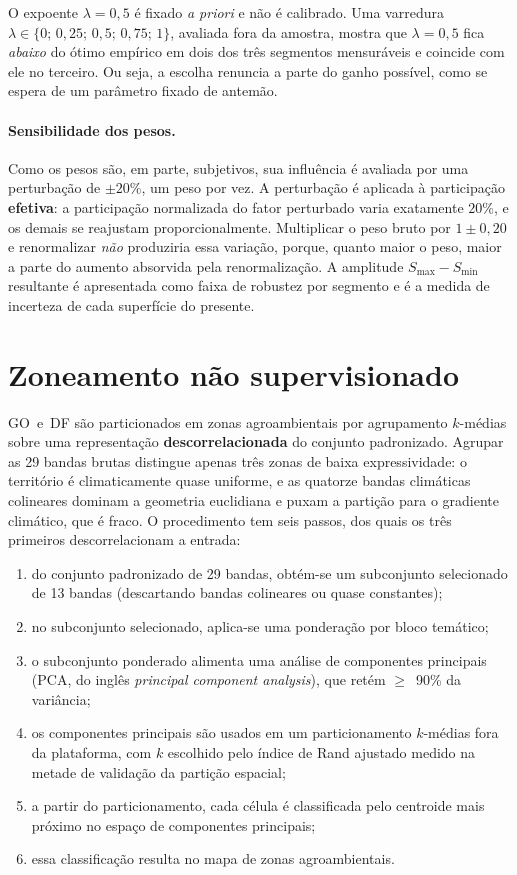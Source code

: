 O expoente $\lambda = 0{,}5$ é fixado \emph{a priori} e não é calibrado. Uma varredura
$\lambda \in \{0;\,0{,}25;\,0{,}5;\,0{,}75;\,1\}$, avaliada fora da amostra, mostra que
$\lambda = 0{,}5$ fica \emph{abaixo} do ótimo empírico em dois dos três segmentos mensuráveis e
coincide com ele no terceiro. Ou seja, a escolha renuncia a parte do ganho possível, como se espera
de um parâmetro fixado de antemão.

\paragraph{Sensibilidade dos pesos.}
Como os pesos são, em parte, subjetivos, sua influência é avaliada por uma perturbação de
$\pm 20\%$, um peso por vez. A perturbação é aplicada à participação \textbf{efetiva}: a participação
normalizada do fator perturbado varia exatamente $20\%$, e os demais se reajustam proporcionalmente.
Multiplicar o peso bruto por $1 \pm 0{,}20$ e renormalizar \emph{não} produziria essa variação, porque,
quanto maior o peso, maior a parte do aumento absorvida pela renormalização. A amplitude
$S_{\max} - S_{\min}$ resultante é apresentada como faixa de robustez por segmento e é a medida de
incerteza de cada superfície do presente.

\section{Zoneamento não supervisionado}\label{sec:zoning}

GO~e~DF são particionados em zonas agroambientais por agrupamento $k$-médias sobre uma representação
\textbf{descorrelacionada} do conjunto padronizado. Agrupar as 29 bandas brutas distingue apenas três
zonas de baixa expressividade: o território é climaticamente quase uniforme, e as quatorze bandas
climáticas colineares dominam a geometria euclidiana e puxam a partição para o gradiente climático,
que é fraco. O procedimento tem seis passos, dos quais os três primeiros descorrelacionam a entrada:

\begin{enumerate}
  \item do conjunto padronizado de 29 bandas, obtém-se um subconjunto selecionado de 13 bandas
    (descartando bandas colineares ou quase constantes);
  \item no subconjunto selecionado, aplica-se uma ponderação por bloco temático;
  \item o subconjunto ponderado alimenta uma análise de componentes principais (PCA, do inglês
    \emph{principal component analysis}), que retém $\geq$~90\% da variância;
  \item os componentes principais são usados em um particionamento $k$-médias fora da plataforma, com
    $k$ escolhido pelo índice de Rand ajustado medido na metade de validação da partição espacial;
  \item a partir do particionamento, cada célula é classificada pelo centroide mais próximo no espaço de
    componentes principais;
  \item essa classificação resulta no mapa de zonas agroambientais.
\end{enumerate}

